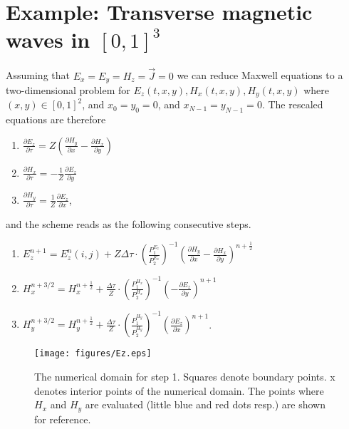 \documentclass[12pt,reqno]{amsart}
\theoremstyle{definition}
\numberwithin{equation}{section}
\begin{document}
	
	
	
	\section{Example: Transverse magnetic waves  in $[0,1]^3$}\label{sec:TE}
	Assuming that $E_x=E_y=H_z=\vec{J}=0$ we can reduce Maxwell equations to a two-dimensional problem for $E_z(t,x,y), H_x(t,x,y), H_y(t,x,y)$ where  $(x,y)\in[0,1]^2$, and
	$x_0=y_0=0$, and $x_{N-1}=y_{N-1}=0$.
	The rescaled equations are therefore 
	
	\begin{enumerate}
		\item  $ \frac{\partial E_z}{\partial \tau }=Z\left (
		\frac{\partial H_y}{\partial x}-\frac{\partial H_x}{\partial y}
		\right)$
		\item 	  $ \frac{\partial H_x}{\partial \tau }=-\frac{1}{Z}\frac{\partial E_z}{\partial y}$
		\item 	  $ \frac{\partial H_y}{\partial \tau }=\frac{1}{Z}\frac{\partial E_z}{\partial x}$,
		
	\end{enumerate}
	and the scheme  reads as the following consecutive steps.
	\begin{enumerate}
		\item  $ E_z^{n+1}=E_z^n(i,j)+Z\Delta \tau \cdot 
		\left(\frac{P_1^{E_z}}{P_2^{E_z}}\right)^{-1}
		\left (\frac{\partial H_y}{\partial x}-
		\frac{\partial H_x}{\partial y}
		\right)^{n+\frac{1}{2}}$\\[1mm]
		\item $ H_x^{n+3/2}=H_x^{n+\frac{1}{2}}+\frac{\Delta \tau}{Z} \cdot  \left(\frac{P_1^{H_x}}{P_2^{H_x}}\right)^{-1}\left (-
		\frac{\partial E_z}{\partial y}
		\right)^{n+1} $\\[1mm]
		\item $ H_y^{n+3/2}=H_y^{n+\frac{1}{2}}+\frac{\Delta \tau}{Z} \cdot  \left(\frac{P_1^{H_y}}{P_2^{H_y}}\right)^{-1}\left (
		\frac{\partial E_z}{\partial x}
		\right)^{n+1} $.
	\end{enumerate}
	\begin{figure}[!t]
		\centering
		\texttt{[image: figures/Ez.eps]}
		\caption{
			The numerical domain for step 1.
			Squares denote boundary points. x denotes interior points of the numerical domain.  The points where $H_x$ and $H_y$ are evaluated (little blue and red dots resp.) are shown for reference.}
		\label{fig:E}
		
	\end{figure}
	
\end{document}
